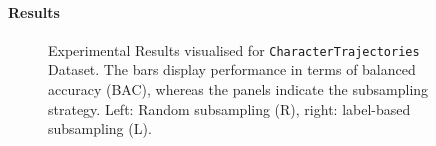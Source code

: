 \documentclass{article}
\begin{document}
\paragraph{Results}
%
\begin{figure}[tbp]
  \caption{Experimental Results visualised for \texttt{CharacterTrajectories} Dataset.
  The bars display performance in terms of balanced accuracy (BAC),
whereas the panels indicate the subsampling strategy.
  Left: Random subsampling (R), right: label-based subsampling (L).}
  \label{fig:results_main}
\end{figure}
\end{document}
